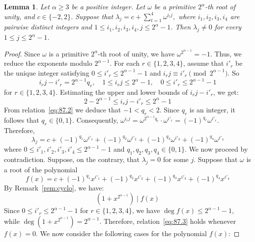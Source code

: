 \documentclass[12pt]{article}
\newtheorem{lemA}[propA]{Lemma}
\begin{document}
  \begin{lemA}\label{lem:nonzero}
  Let $\alpha \ge 3$ be a positive integer. Let $\omega$ be a primitive $2^\alpha$-th root of unity, and $c\in\{-2,2\}$. Suppose that
  $
  \lambda_j=c+\sum_{t=1}^{4}\omega^{i_tj},
  $
  where $i_1,i_2,i_3,i_4$ are pairwise distinct integers and
  $1\le i_1,i_2,i_3,i_4,j\le 2^\alpha-1$.
  Then $\lambda_j\ne0$ for every $1\le j\le 2^\alpha-1$.
\end{lemA}
  \begin{proof}	
 Since $\omega$ is a primitive $2^{\alpha}$-th root of unity, we have $\omega^{2^{\alpha-1}} = -1$. Thus, we reduce the exponents modulo $2^{\alpha-1}$. For each $r \in \{1, 2, 3, 4\}$, assume that $i'_r$ be the unique integer satisfying $0 \le i'_r \le 2^{\alpha-1} - 1$ and $i_r j \equiv i'_r \pmod{2^{\alpha-1}}$. So
 \begin{equation}\label{eq:87.2}
 	i_r j - i'_r = 2^{\alpha-1} q_r, \quad 1 \le i_r j \le 2^\alpha - 1, \quad 0 \le i'_r \le 2^{\alpha-1} - 1
 \end{equation}
 for $r \in \{1, 2, 3, 4\}$.
  Estimating the upper and lower bounds of $i_r j - i'_r$, we get:
 \begin{equation*}
 	2 - 2^{\alpha-1} \le i_r j - i'_r \le 2^\alpha - 1
 \end{equation*}
 From relation~\eqref{eq:87.2}  we deduce that $-1 < q_r < 2$. Since $q_r$ is an integer, it follows that $q_r \in \{0, 1\}$. Consequently,
$
 	\omega^{i_r j} = \omega^{2^{\alpha-1} q_r} \cdot \omega^{i'_r} = (-1)^{q_r} \omega^{i'_r}.
$
 Therefore,
 \begin{equation}
 	\lambda_j = c + (-1)^{q_1}\omega^{i'_1} + (-1)^{q_2}\omega^{i'_2} + (-1)^{q_3}\omega^{i'_3} + (-1)^{q_4}\omega^{i'_4} \label{eq:88.2}
 \end{equation}
 where $0 \le i'_1, i'_2, i'_3, i'_4 \le 2^{\alpha-1} - 1$ and $q_1, q_2, q_3, q_4 \in \{0, 1\}$. We now proceed by contradiction. Suppose, on the contrary, that \(\lambda_j = 0\) for some \(j\).
 Suppose that \(\omega\) is a root of the polynomial
 \[
 f(x)=c+(-1)^{q_1}x^{i'_1}+(-1)^{q_2}x^{i'_2}+(-1)^{q_3}x^{i'_3}+(-1)^{q_4}x^{i'_4}
 \]
 By Remark~\ref{rem:cyclo}, we have:
 \begin{equation}\label{eq:87.3}
 (1+x^{2^{\alpha-1}}) \mid f(x)
 \end{equation}
 Since \(0 \le i'_r \le 2^{\alpha-1}-1\) for $r \in \{1, 2, 3, 4\}$, we have \(\deg f(x) \le 2^{\alpha-1}-1\), while \(\deg(1+x^{2^{\alpha-1}})=2^{\alpha-1}\). Therefore, relation~\eqref{eq:87.3} holds whenever $f(x)=0$. We now consider the following cases for the polynomial $f(x)$:


\end{proof}
\end{document}
